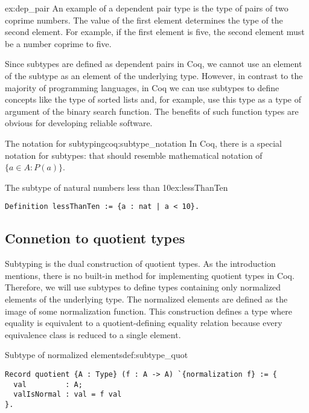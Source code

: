 \begin{example}{}{ex:dep_pair}
An example of a dependent pair type is the type of pairs of two coprime numbers. The value of the first element determines the type of the second element. For example, if the first element is five, the second element must be a number coprime to five.
\end{example}
Since subtypes are defined as dependent pairs in Coq, we cannot use an element of the subtype as an element of the underlying type. However, in contrast to the majority of programming languages, in Coq we can use subtypes to define concepts like the type of sorted lists and, for example, use this type as a type of argument of the binary search function. The benefits of such function types are obvious for developing reliable software.
\begin{coq}{The notation for subtyping}{coq:subtype_notation}
In Coq, there is a special notation for subtypes:  that should resemble mathematical notation of $\{a \in A: P(a)\}$.
\end{coq}
\begin{example}{The subtype of natural numbers less than 10}{ex:lessThanTen}
\begin{verbatim}
Definition lessThanTen := {a : nat | a < 10}.
\end{verbatim}
\end{example}
\subsection{Connetion to quotient types}
Subtyping is the dual construction of quotient types. As the introduction mentions, there is no built-in method for implementing quotient types in Coq. Therefore, we will use subtypes to define types containing only normalized elements of the underlying type. The normalized elements are defined as the image of some normalization function. This construction defines a type where equality is equivalent to a quotient-defining equality relation because every equivalence class is reduced to a single element.
\begin{defi}{Subtype of normalized elements}{def:subtype_quot}
\begin{verbatim}
Record quotient {A : Type} (f : A -> A) `{normalization f} := {
  val         : A;
  valIsNormal : val = f val
}.
\end{verbatim}
\end{defi}
